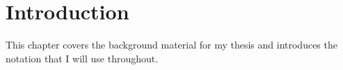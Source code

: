 \documentclass[12pt,MSc,twoside]{muthesis}
\begin{document}
\iffalse 
	 
\fi



\chapter{Introduction}
%
This chapter covers the background material for my thesis and introduces
the notation that I will use throughout.






\end{document}
